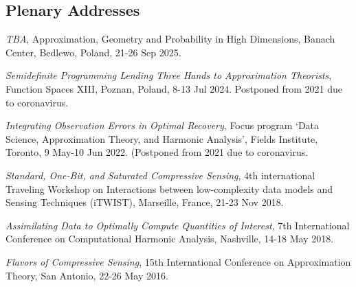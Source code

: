 \documentclass[11pt]{article}
\begin{document}
\subsection{Plenary Addresses}
\bitemize
\item {\sl TBA}, Approximation, Geometry and Probability in High Dimensions, Banach Center, Bedlewo, Poland,
21-26 Sep 2025.
\item {\sl Semidefinite Programming Lending Three Hands to Approximation Theorists}, Function Spaces XIII, Poznan, Poland,  8-13 Jul 2024.
{\small Postponed  from 2021 due to coronavirus.} %
\item {\sl Integrating Observation Errors in Optimal Recovery}, Focus program `Data Science, Approximation Theory, and Harmonic Analysis', Fields Institute, Toronto,  9 May-10 Jun 2022.
{\small (Postponed from 2021 due to coronavirus.} %
\item {\sl Standard, One-Bit, and Saturated Compressive Sensing}, 4th international Traveling Workshop on Interactions between low-complexity data models and Sensing Techniques (iTWIST),
Marseille, France, 21-23 Nov 2018.
\item {\sl Assimilating Data to Optimally Compute Quantities of Interest}, 7th International Conference on Computational Harmonic Analysis,
Nashville, 14-18 May 2018.
\item {\sl Flavors of Compressive Sensing}, 
15th International Conference on Approximation Theory, San Antonio, 22-26 May 2016.
\eitemize
\end{document}
